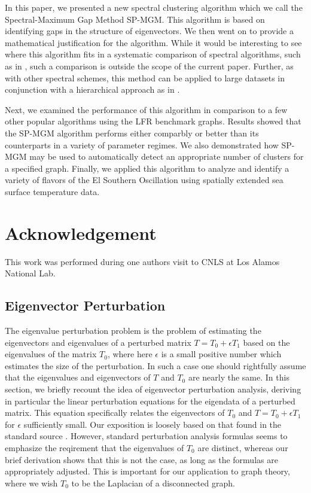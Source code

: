 \documentclass[10pt,journal,compsoc]{IEEEtran} %
\theoremstyle{definition}
\newcommand{\nino}{\text{Ni\~{n}o }}
\begin{document}
In this paper, we presented a new spectral clustering algorithm which
we call the Spectral-Maximum Gap Method SP-MGM. This algorithm is
based on identifying gaps in the structure of eigenvectors.  We then
went on to provide a mathematical justification for the
algorithm. While it would be interesting to see where this algorithm
fits in a systematic comparison of spectral algorithms, such as in
\cite{verma2003comparison}, such a comparison is outside the scope of
the current paper. Further, as with other spectral schemes, this
method can be applied to large datasets in conjunction with a
hierarchical approach as in \citep[][and others]{luxburg2005limits,
  tung2010enabling, semertzidis2015large, peluffo2014short}.

Next, we examined the performance of this algorithm in comparison to a
few other popular algorithms using the LFR benchmark graphs.  Results
showed that the SP-MGM algorithm performs either comparbly or better
than its counterparts in a variety of parameter regimes.  We also
demonstrated how SP-MGM may be used to automatically detect an
appropriate number of clusters for a specified graph.  Finally, we
applied this algorithm to analyze and identify a variety of flavors of
the El \nino Southern Oscillation using spatially extended sea surface
temperature data.


\section*{Acknowledgement} This work was performed during one authors
visit to CNLS at Los Alamos National Lab.

\appendix
\subsection*{Eigenvector Perturbation}
The eigenvalue perturbation problem is the problem of estimating the
eigenvectors and eigenvalues of a perturbed matrix $T = T_0 + \epsilon
T_1$ based on the eigenvalues of the matrix $T_0$, where here
$\epsilon$ is a small positive number which estimates the size of the
perturbation.  In such a case one should rightfully assume that the
eigenvalues and eigenvectors of $T$ and $T_0$ are nearly the same.  In
this section, we briefly recount the idea of eigenvector perturbation
analysis, deriving in particular the linear perturbation equations for
the eigendata of a perturbed matrix.  This equation specifically
relates the eigenvectors of $T_0$ and $T = T_0+\epsilon T_1$ for
$\epsilon$ sufficiently small.  Our exposition is loosely based on
that found in the standard source \cite{demmel1997applied}.  However,
standard perturbation analysis formulas seems to emphasize the
reqirement that the eigenvalues of $T_0$ are distinct, whereas our
brief derivation shows that this is not the case, as long as the
formulas are appropriately adjusted.  This is important for our
application to graph theory, where we wish $T_0$ to be the Laplacian
of a disconnected graph.
\end{document}
